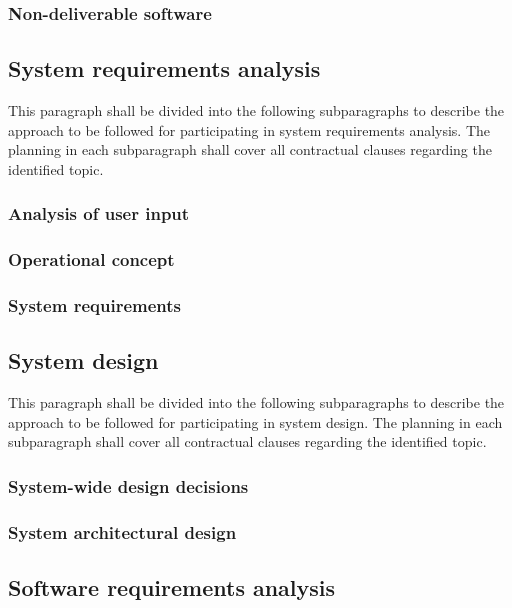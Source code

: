 \documentclass{fidata-report-template}
\begin{document}
\subsubsection{Non-deliverable software}

\subsection{System requirements analysis}

This paragraph shall be divided into the following subparagraphs to
describe the approach to be followed for participating in system
requirements analysis. The planning in each subparagraph shall cover all
contractual clauses regarding the identified topic.

\subsubsection{Analysis of user input}

\subsubsection{Operational concept}

\subsubsection{System requirements}

\subsection{System design}

This paragraph shall be divided into the following subparagraphs to
describe the approach to be followed for participating in system design.
The planning in each subparagraph shall cover all contractual clauses
regarding the identified topic.

\subsubsection{System-wide design decisions}
\subsubsection{System architectural design}

\subsection{Software requirements analysis}
\end{document}
